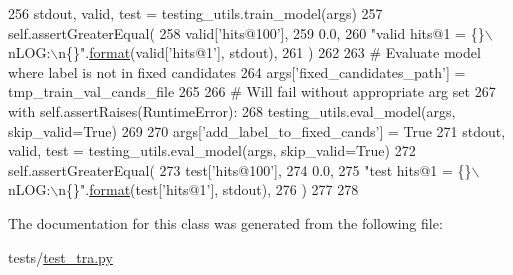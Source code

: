 \begin{DoxyCode}
256             stdout, valid, test = testing\_utils.train\_model(args)
257             self.assertGreaterEqual(
258                 valid[\textcolor{stringliteral}{'hits@100'}],
259                 0.0,
260                 \textcolor{stringliteral}{"valid hits@1 = \{\}\(\backslash\)nLOG:\(\backslash\)n\{\}"}.\hyperlink{namespaceparlai_1_1chat__service_1_1services_1_1messenger_1_1shared__utils_a32e2e2022b824fbaf80c747160b52a76}{format}(valid[\textcolor{stringliteral}{'hits@1'}], stdout),
261             )
262 
263             \textcolor{comment}{# Evaluate model where label is not in fixed candidates}
264             args[\textcolor{stringliteral}{'fixed\_candidates\_path'}] = tmp\_train\_val\_cands\_file
265 
266             \textcolor{comment}{# Will fail without appropriate arg set}
267             with self.assertRaises(RuntimeError):
268                 testing\_utils.eval\_model(args, skip\_valid=\textcolor{keyword}{True})
269 
270             args[\textcolor{stringliteral}{'add\_label\_to\_fixed\_cands'}] = \textcolor{keyword}{True}
271             stdout, valid, test = testing\_utils.eval\_model(args, skip\_valid=\textcolor{keyword}{True})
272             self.assertGreaterEqual(
273                 test[\textcolor{stringliteral}{'hits@100'}],
274                 0.0,
275                 \textcolor{stringliteral}{"test hits@1 = \{\}\(\backslash\)nLOG:\(\backslash\)n\{\}"}.\hyperlink{namespaceparlai_1_1chat__service_1_1services_1_1messenger_1_1shared__utils_a32e2e2022b824fbaf80c747160b52a76}{format}(test[\textcolor{stringliteral}{'hits@1'}], stdout),
276             )
277 
278 
\end{DoxyCode}


The documentation for this class was generated from the following file\+:\begin{DoxyCompactItemize}
\item 
tests/\hyperlink{test__tra_8py}{test\+\_\+tra.\+py}\end{DoxyCompactItemize}
